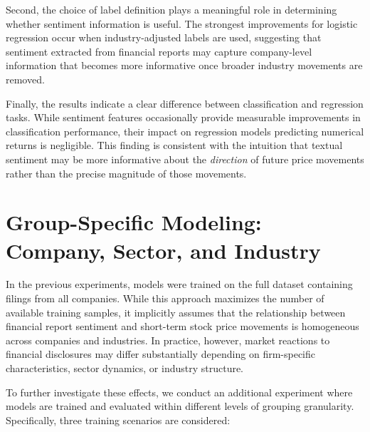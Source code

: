 Second, the choice of label definition plays a meaningful role in determining whether sentiment information is useful. The strongest improvements for logistic regression occur when industry-adjusted labels are used, suggesting that sentiment extracted from financial reports may capture company-level information that becomes more informative once broader industry movements are removed.

Finally, the results indicate a clear difference between classification and regression tasks. While sentiment features occasionally provide measurable improvements in classification performance, their impact on regression models predicting numerical returns is negligible. This finding is consistent with the intuition that textual sentiment may be more informative about the \emph{direction} of future price movements rather than the precise magnitude of those movements.

\section{Group-Specific Modeling: Company, Sector, and Industry}

In the previous experiments, models were trained on the full dataset containing filings from all companies. While this approach maximizes the number of available training samples, it implicitly assumes that the relationship between financial report sentiment and short-term stock price movements is homogeneous across companies and industries. In practice, however, market reactions to financial disclosures may differ substantially depending on firm-specific characteristics, sector dynamics, or industry structure.

To further investigate these effects, we conduct an additional experiment where models are trained and evaluated within different levels of grouping granularity. Specifically, three training scenarios are considered:

